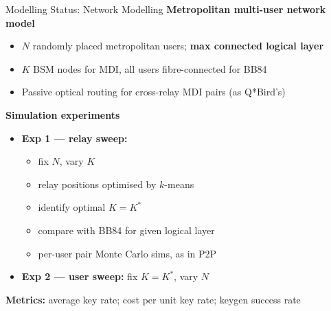 \documentclass[10pt]{beamer}
\begin{document}
\begin{frame}{Modelling Status: Network Modelling}
    \textbf{Metropolitan multi-user network model}
    \begin{itemize}\small
        \item $N$ randomly placed metropolitan users; \textbf{max connected logical layer}
        \item $K$ BSM nodes for MDI, all users fibre-connected for BB84
        \item Passive optical routing for cross-relay MDI pairs (as Q*Bird's)
    \end{itemize}
    \vspace{0.2cm}
    \textbf{Simulation experiments}
    \begin{itemize}\small
        \item \textbf{Exp 1 — relay sweep:} 
        \begin{itemize}
            \item fix $N$, vary $K$
            \item relay positions optimised by $k$-means
            \item identify optimal $K=K^*$
            \item compare with BB84 for given logical layer
            \item per-user pair Monte Carlo sims, as in P2P
        \end{itemize}
        \item \textbf{Exp 2 — user sweep:} fix $K=K^*$, vary $N$
    \end{itemize}
    \vspace{0.2cm}
    \textbf{Metrics:} average key rate; cost per unit key rate; keygen success rate
\end{frame}
\end{document}
